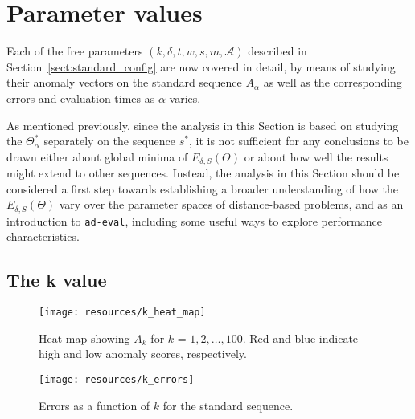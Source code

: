 \clearpage

\section{Parameter values}
\label{sect:params}

Each of the free parameters $(k, \delta, t, w, s, m, \mathcal{A})$ described in Section~\ref{sect:standard_config} are now covered in detail, by means of studying their anomaly vectors on the standard sequence $A_\alpha$ as well as the corresponding errors and evaluation times as $\alpha$ varies.

As mentioned previously, since the analysis in this Section is based on studying the $\Theta_{\alpha}^*$ separately on the sequence $s^*$, it is not sufficient for any conclusions to be drawn either about global minima of $E_{\delta, S}(\Theta)$ or about how well the results might extend to other sequences. Instead, the analysis in this Section should be considered a first step towards establishing a broader understanding of how the $E_{\delta, S}(\Theta)$ vary over the parameter spaces of distance-based problems, and as an introduction to \texttt{ad-eval}, including some useful ways to explore performance characteristics.

\subsection{The k value}
\FloatBarrier{}

\begin{figure}[h]
    \vspace{-10pt}
    \begin{center}
        \texttt{[image: resources/k\_heat\_map]}
    \end{center}
    \vspace{-20pt}
    \caption{\small{Heat map showing $A_k$ for $k$ = $1, 2, \dots, 100$. Red and blue indicate high and low anomaly scores, respectively.}}
\label{fig:k_heat_map}
\end{figure}

\begin{wrapfigure}{r}{0.5\textwidth}
    \vspace{-30pt}
    \begin{center}
        \texttt{[image: resources/k\_errors]}
    \end{center}
    \vspace{-20pt}
    \caption{\small{Errors as a function of $k$ for the standard sequence.}}
\label{fig:k_errors}
    \vspace{-10pt}
\end{wrapfigure}

